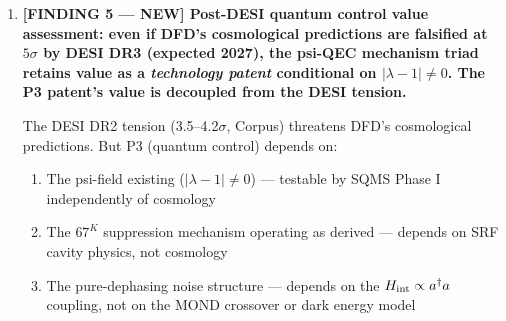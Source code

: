 \documentclass[11pt]{article}
\theoremstyle{definition}
\theoremstyle{remark}
\newcommand{\lamdiff}{|\lambda-1|}
\begin{document}
\begin{tcolorbox}[colback=blue!5!white, colframe=blue!60!black,
  title=\textbf{W4i15 TOP 5 FINDINGS --- READ FIRST}]
\begin{enumerate}[nosep]
  The absence of a sign problem and the regularity of $\mu$ together
  imply that classical Monte Carlo methods (including multigrid and
  AMR) can solve the DFD field equation efficiently.  Quantum simulation
  offers at most polynomial speedup via quantum linear algebra
  subroutines (HHL-type), but the practical crossover is at
  $N > 10^{10}$ --- far beyond foreseeable quantum hardware.

  \textbf{Honest negative}: The 24-qubit void circuit (W4i14 Finding~3)
  is a pedagogical demonstration, not a practical computation.  DFD
  simulation will be done classically for the foreseeable future.  The
  urgent need is a classical DFD Boltzmann code (Corpus: ``3--6 months
  for a competent cosmologist''), not a quantum simulation.

  \textbf{Where quantum advantage DOES exist for DFD}: Quantum advantage
  exists not for simulating the DFD field equation, but for:
  \begin{enumerate}[nosep]
    \item \textbf{Optimizing $\mu$-function parameters}: Quantum
      optimization (QAOA, VQE) over the $(\alpha, \lambda)$ parameter
      space of $\mu_{\alpha,\lambda}(x)$ to fit DESI/Euclid data.
      This is a combinatorial optimization problem where quantum speedup
      is plausible (but unproven for this specific instance).
    \item \textbf{Psi-field quantum sensing} (P6): Using psi-coupled
      qubit arrays as gravitational sensors, where quantum entanglement
      provides genuine Heisenberg-limited sensitivity.
  \end{enumerate}

\item \textbf{[FINDING 5 --- NEW] Post-DESI quantum control value
  assessment: even if DFD's cosmological predictions are falsified at
  $5\sigma$ by DESI DR3 (expected 2027), the psi-QEC mechanism triad
  retains value as a \emph{technology patent} conditional on
  $\lamdiff \neq 0$.  The P3 patent's value is decoupled from the
  DESI tension.}

  The DESI DR2 tension (3.5--4.2$\sigma$, Corpus) threatens DFD's
  cosmological predictions.  But P3 (quantum control) depends on:
  \begin{enumerate}[nosep]
    \item The psi-field existing ($\lamdiff \neq 0$) --- testable by
      SQMS Phase I independently of cosmology
    \item The $67^K$ suppression mechanism operating as derived ---
      depends on SRF cavity physics, not cosmology
    \item The pure-dephasing noise structure --- depends on the
      $H_{\rm int} \propto a^\dagger a$ coupling, not on the MOND
      crossover or dark energy model
  \end{enumerate}


\end{enumerate}
\end{tcolorbox}
\end{document}
